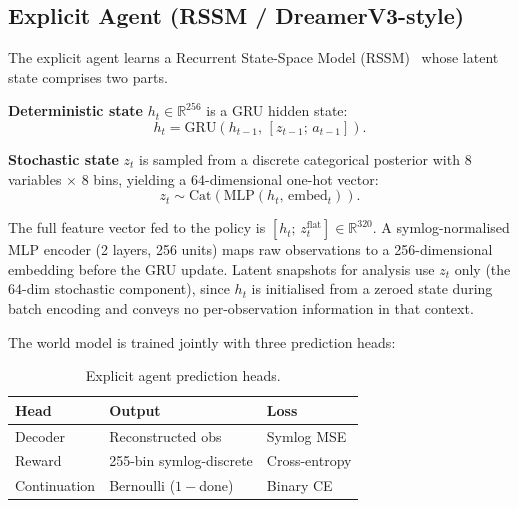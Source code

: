 \documentclass{article}
\begin{document}
\subsection{Explicit Agent (RSSM / DreamerV3-style)}
\label{sec:explicit}

The explicit agent learns a Recurrent State-Space Model (RSSM)~\citep{hafner2019rssm}
whose latent state comprises two parts.

\textbf{Deterministic state} $h_t \in \mathbb{R}^{256}$ is a GRU hidden state:
\begin{equation}
  h_t = \mathrm{GRU}(h_{t-1},\,[z_{t-1};\, a_{t-1}]).
\end{equation}

\textbf{Stochastic state} $z_t$ is sampled from a discrete categorical posterior with
$8$ variables $\times$ $8$ bins, yielding a $64$-dimensional one-hot vector:
\begin{equation}
  z_t \sim \mathrm{Cat}\!\left(\mathrm{MLP}(h_t,\, \mathrm{embed}_t)\right).
\end{equation}

The full feature vector fed to the policy is $[h_t;\, z_t^{\mathrm{flat}}] \in \mathbb{R}^{320}$.
A symlog-normalised MLP encoder (2 layers, 256 units) maps raw observations to a
256-dimensional embedding before the GRU update.
Latent snapshots for analysis use $z_t$ only (the $64$-dim stochastic component),
since $h_t$ is initialised from a zeroed state during batch encoding and conveys no
per-observation information in that context.

The world model is trained jointly with three prediction heads:

\begin{table}[h]
\caption{Explicit agent prediction heads.}
\label{tab:heads}
\vskip 0.1in
\begin{center}
\begin{small}
\begin{sc}
\begin{tabular}{lll}
\toprule
Head        & Output                      & Loss \\
\midrule
Decoder     & Reconstructed obs           & Symlog MSE \\
Reward      & 255-bin symlog-discrete     & Cross-entropy \\
Continuation & Bernoulli ($1-$done)       & Binary CE \\
\bottomrule
\end{tabular}
\end{sc}
\end{small}
\end{center}
\vskip -0.1in
\end{table}
\end{document}
